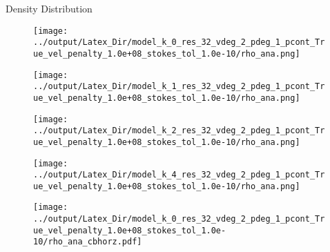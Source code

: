 \documentclass[10pt,aspectratio=169]{beamer}
\begin{document}

\begin{frame}[fragile]{Density Distribution}
	\begin{figure}[!htb]
		\begin{multicols}{4}
			\texttt{[image: ../output/Latex\_Dir/model\_k\_0\_res\_32\_vdeg\_2\_pdeg\_1\_pcont\_True\_vel\_penalty\_1.0e+08\_stokes\_tol\_1.0e-10/rho\_ana.png]}\par
			\hspace{0.75in}
			\texttt{[image: ../output/Latex\_Dir/model\_k\_1\_res\_32\_vdeg\_2\_pdeg\_1\_pcont\_True\_vel\_penalty\_1.0e+08\_stokes\_tol\_1.0e-10/rho\_ana.png]}\par
			\hspace{1.5in}
			\texttt{[image: ../output/Latex\_Dir/model\_k\_2\_res\_32\_vdeg\_2\_pdeg\_1\_pcont\_True\_vel\_penalty\_1.0e+08\_stokes\_tol\_1.0e-10/rho\_ana.png]}\par
			\hspace{2.25in}
			\texttt{[image: ../output/Latex\_Dir/model\_k\_4\_res\_32\_vdeg\_2\_pdeg\_1\_pcont\_True\_vel\_penalty\_1.0e+08\_stokes\_tol\_1.0e-10/rho\_ana.png]}\par
		\end{multicols}
	\end{figure}
	
	\vspace{-0.4in}
	
	\begin{figure}
		\hspace{0.2in} 
		\texttt{[image: ../output/Latex\_Dir/model\_k\_0\_res\_32\_vdeg\_2\_pdeg\_1\_pcont\_True\_vel\_penalty\_1.0e+08\_stokes\_tol\_1.0e-10/rho\_ana\_cbhorz.pdf]}
	\end{figure}
\end{frame}
\end{document}
